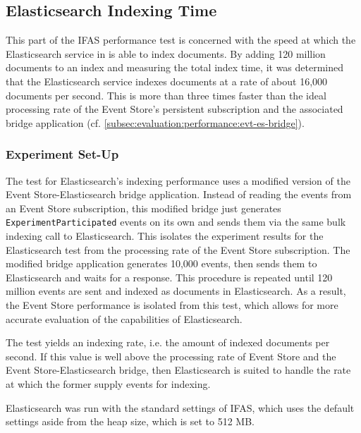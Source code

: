 \subsection{Elasticsearch Indexing Time}
\label{subsec:evaluation:performance:elasticsearch}

This part of the \ac{IFAS} performance test is concerned with the speed at which the Elasticsearch service in is able to index documents.
By adding 120 million documents to an index and measuring the total index time, it was determined that the Elasticsearch service indexes documents at a rate of about 16,000 documents per second.
This is more than three times faster than the ideal processing rate of the Event Store's persistent subscription and the associated bridge application (cf. \cref{subsec:evaluation:performance:evt-es-bridge}).

\subsubsection{Experiment Set-Up}

The test for Elasticsearch's indexing performance uses a modified version of the Event Store-Elasticsearch bridge application.
Instead of reading the events from an Event Store subscription, this modified bridge just generates \texttt{ExperimentParticipated} events on its own and sends them via the same bulk indexing call to Elasticsearch.
This isolates the experiment results for the Elasticsearch test from the processing rate of the Event Store subscription.
The modified bridge application generates 10,000 events, then sends them to Elasticsearch and waits for a response.
This procedure is repeated until 120 million events are sent and indexed as documents in Elasticsearch.
As a result, the Event Store performance is isolated from this test, which allows for more accurate evaluation of the capabilities of Elasticsearch.

The test yields an indexing rate, i.e. the amount of indexed documents per second.
If this value is well above the processing rate of Event Store and the Event Store-Elasticsearch bridge, then Elasticsearch is suited to handle the rate at which the former supply events for indexing.

Elasticsearch was run with the standard settings of \ac{IFAS}, which uses the default settings aside from the heap size, which is set to 512 MB.


